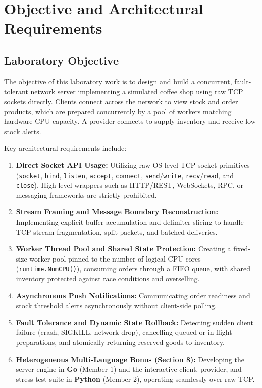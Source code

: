 \documentclass{labreport}
\begin{document}

\tableofcontents
\newpage

\section{Objective and Architectural Requirements}

\subsection{Laboratory Objective}
The objective of this laboratory work is to design and build a concurrent, fault-tolerant network server implementing a simulated coffee shop using raw TCP sockets directly. Clients connect across the network to view stock and order products, which are prepared concurrently by a pool of workers matching hardware CPU capacity. A provider connects to supply inventory and receive low-stock alerts. 

Key architectural requirements include:
\begin{enumerate}
    \item \textbf{Direct Socket API Usage:} Utilizing raw OS-level TCP socket primitives (\texttt{socket}, \texttt{bind}, \texttt{listen}, \texttt{accept}, \texttt{connect}, \texttt{send}/\texttt{write}, \texttt{recv}/\texttt{read}, and \texttt{close}). High-level wrappers such as HTTP/REST, WebSockets, RPC, or messaging frameworks are strictly prohibited.
    \item \textbf{Stream Framing and Message Boundary Reconstruction:} Implementing explicit buffer accumulation and delimiter slicing to handle TCP stream fragmentation, split packets, and batched deliveries.
    \item \textbf{Worker Thread Pool and Shared State Protection:} Creating a fixed-size worker pool pinned to the number of logical CPU cores (\texttt{runtime.NumCPU()}), consuming orders through a FIFO queue, with shared inventory protected against race conditions and overselling.
    \item \textbf{Asynchronous Push Notifications:} Communicating order readiness and stock threshold alerts asynchronously without client-side polling.
    \item \textbf{Fault Tolerance and Dynamic State Rollback:} Detecting sudden client failure (crash, SIGKILL, network drop), cancelling queued or in-flight preparations, and atomically returning reserved goods to inventory.
    \item \textbf{Heterogeneous Multi-Language Bonus (Section 8):} Developing the server engine in \textbf{Go} (Member 1) and the interactive client, provider, and stress-test suite in \textbf{Python} (Member 2), operating seamlessly over raw TCP.
\end{enumerate}
\end{document}
